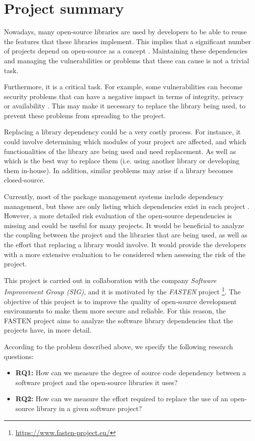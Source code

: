 \section{Project summary} \label{section:project-summary} %
Nowadays, many open-source libraries are used by developers to be able to reuse the features that these libraries implement.
This implies that a significant number of projects depend on open-source as a concept \cite{kula2014visualizing}.
Maintaining these dependencies and managing the vulnerabilities or problems that these can cause is not a trivial task.

Furthermore, it is a critical task. For example, some vulnerabilities can become security problems that can have a negative impact in terms of integrity, privacy or availability \cite{CVE-FAQ}. This may make it necessary to replace the library being used, to prevent these problems from spreading to the project.

Replacing a library dependency could be a very costly process. For instance, it could involve determining which modules of your project are affected, and which functionalities of the library are being used and need replacement. As well as which is the best way to replace them (i.e. using another library or developing them in-house).
In addition, similar problems may arise if a library becomes closed-source.

Currently, most of the package management systems include dependency management, but these are only listing which dependencies exist in each project \cite{hejderup2018prazi}.
However, a more detailed risk evaluation of the open-source dependencies is missing and could be useful for many projects.
It would be beneficial to analyze the coupling between the project and the libraries that are being used, as well as the effort that replacing a library would involve. It would provide the developers with a more extensive evaluation to be considered when assessing the risk of the project.

This project is carried out in collaboration with the company \textit{Software Improvement Group (SIG)}, and it is motivated by the \textit{FASTEN} project \footnote{\url{https://www.fasten-project.eu/}}. The objective of this project is to improve the quality of open-source development environments to make them more secure and reliable. For this reason, the FASTEN project aims to analyze the software library dependencies that the projects have, in more detail.

\bigskip\noindent
According to the problem described above, we specify the following research questions:

\begin{itemize}
    \item \textbf{RQ1:} How can we measure the degree of source code dependency between a software project and the open-source libraries it uses?
    \item \textbf{RQ2:} How can we measure the effort required to replace the use of an open-source library in a given software project?
\end{itemize}
